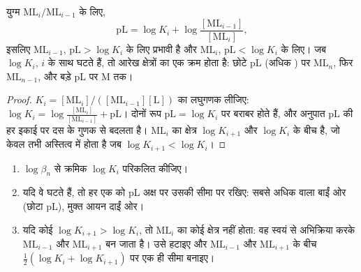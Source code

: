\begin{proposition}[pL में सीमाएँ]\label{prop:b1:complexation:pl-boundaries}
युग्म $\mathrm{ML}_i/\mathrm{ML}_{i-1}$ के लिए,
\[
  \mathrm{pL} = \log K_i + \log\frac{[\mathrm{ML}_{i-1}]}{[\mathrm{ML}_i]} ,
\]
इसलिए $\mathrm{ML}_{i-1}$, $\mathrm{pL} > \log K_i$ के लिए प्रभावी है और
$\mathrm{ML}_i$, $\mathrm{pL} < \log K_i$ के लिए। जब $\log K_i$, $i$ के साथ
घटते हैं, तो आरेख क्षेत्रों का एक क्रम होता है: छोटे pL (अधिक ) पर $\mathrm{ML}_n$,
फिर $\mathrm{ML}_{n-1}$, और बड़े pL पर M तक।
\end{proposition}

\begin{proof}
$K_i = [\mathrm{ML}_i]/([\mathrm{ML}_{i-1}][\mathrm{L}])$ का लघुगणक लीजिए:
$\log K_i = \log\frac{[\mathrm{ML}_i]}{[\mathrm{ML}_{i-1}]} + \mathrm{pL}$।
दोनों रूप $\mathrm{pL} = \log K_i$ पर बराबर होते हैं, और अनुपात pL की
हर इकाई पर दस के गुणक से बदलता है। $\mathrm{ML}_i$ का क्षेत्र
$\log K_{i+1}$ और $\log K_i$ के बीच है, जो केवल तभी अस्तित्व में होता है जब $\log K_{i+1} < \log
K_i$।
\end{proof}

\begin{method}[pL आरेख बनाना]\label{met:b1:complexation:pl-diagram}
\begin{enumerate}
  \item $\log\beta_n$ से क्रमिक $\log K_i$ परिकलित कीजिए।
  \item यदि वे घटते हैं, तो हर एक को pL अक्ष पर उसकी सीमा पर रखिए:
        सबसे अधिक  वाला  बाईं ओर (छोटा pL), मुक्त
        आयन दाईं ओर।
  \item यदि कोई $\log K_{i+1} > \log K_i$, तो  $\mathrm{ML}_i$ का
        कोई क्षेत्र नहीं होता: वह स्वयं से अभिक्रिया करके $\mathrm{ML}_{i-1}$ और
        $\mathrm{ML}_{i+1}$ बन जाता है। उसे हटाइए और
        $\mathrm{ML}_{i-1}$ और $\mathrm{ML}_{i+1}$ के बीच
        $\frac12(\log K_i + \log K_{i+1})$ पर एक ही सीमा बनाइए।
\end{enumerate}
\end{method}

